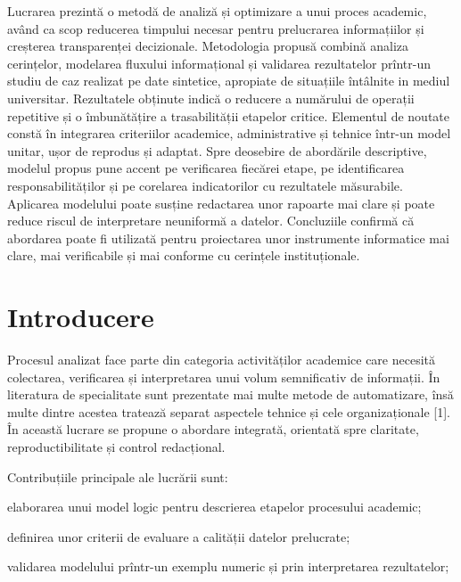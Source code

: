 \documentclass{utmconf}
\begin{document}
\makeutmtitle

\begin{rezumat}
Lucrarea prezintă o metodă de analiză și optimizare a unui proces academic, având ca scop reducerea timpului necesar pentru prelucrarea informațiilor și creșterea transparenței decizionale. Metodologia propusă combină analiza cerințelor, modelarea fluxului informațional și validarea rezultatelor prîntr-un studiu de caz realizat pe date sintetice, apropiate de situațiile întâlnite in mediul universitar. Rezultatele obținute indică o reducere a numărului de operații repetitive și o îmbunătățire a trasabilității etapelor critice. Elementul de noutate constă în integrarea criteriilor academice, administrative și tehnice într-un model unitar, ușor de reprodus și adaptat. Spre deosebire de abordările descriptive, modelul propus pune accent pe verificarea fiecărei etape, pe identificarea responsabilităților și pe corelarea indicatorilor cu rezultatele măsurabile. Aplicarea modelului poate susține redactarea unor rapoarte mai clare și poate reduce riscul de interpretare neuniformă a datelor. Concluziile confirmă că abordarea poate fi utilizată pentru proiectarea unor instrumente informatice mai clare, mai verificabile și mai conforme cu cerințele instituționale.
\end{rezumat}


\section*{Introducere}

Procesul analizat face parte din categoria activităților academice care necesită colectarea, verificarea și interpretarea unui volum semnificativ de informații. În literatura de specialitate sunt prezentate mai multe metode de automatizare, însă multe dintre acestea tratează separat aspectele tehnice și cele organizaționale [1]. În această lucrare se propune o abordare integrată, orientată spre claritate, reproductibilitate și control redacțional.

Contribuțiile principale ale lucrării sunt:
\begin{utmenumerate}
\item elaborarea unui model logic pentru descrierea etapelor procesului academic;
\item definirea unor criterii de evaluare a calității datelor prelucrate;
\item validarea modelului prîntr-un exemplu numeric și prin interpretarea rezultatelor;
\end{utmenumerate}
\end{document}
